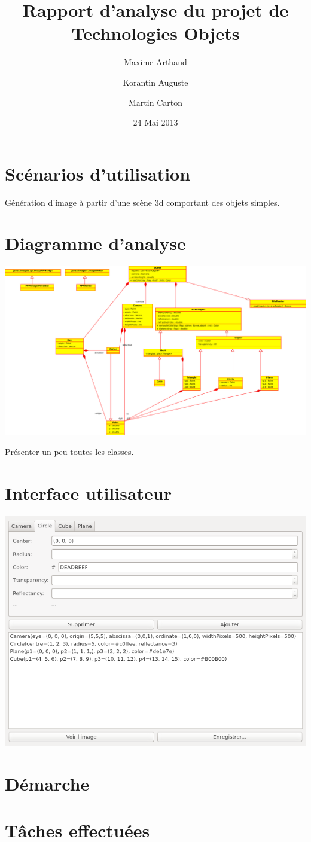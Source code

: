 \documentclass[a4paper]{article}
\title{Rapport d'analyse du projet de Technologies Objets}
\author{Maxime Arthaud \and Korantin Auguste \and Martin Carton}
\date{24 Mai 2013}
\begin{document}
\maketitle

\section{Scénarios d'utilisation}
  Génération d'image à partir d'une scène 3d comportant des objets simples.

\section{Diagramme d'analyse}
  \begin{centering}
    \centerline{\includegraphics[width=1.5\textwidth]{uml.pdf}}
  \end{centering}
  Présenter un peu toutes les classes.

\section{Interface utilisateur}
  \begin{centering}
    \centerline{\includegraphics[width=1.5\textwidth]{gui.png}}
  \end{centering}
\section{Démarche}
\section{Tâches effectuées}
\end{document}

